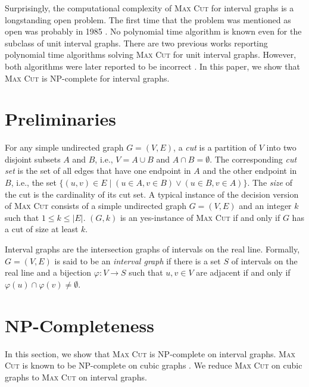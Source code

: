 \documentclass[11pt]{article}
\begin{document}
Surprisingly, the computational complexity of \textsc{Max Cut} for interval graphs is a longstanding open problem. The first time that the problem was mentioned as open was probably in 1985 \cite{JOHNSON1985434}. No polynomial time algorithm is known even for the subclass of unit interval graphs. There are two previous works \cite{bodlaender1999simple, boyaci2017polynomial} reporting polynomial time algorithms solving \textsc{Max Cut} for unit interval graphs. However, both algorithms were later reported to be incorrect \cite{bodlaender2004simple, kratochvil2020u}. In this paper, we show that \textsc{Max Cut} is NP-complete for interval graphs. 


\section{Preliminaries}

For any simple undirected graph $G = (V, E)$, a \emph{cut} is a partition of $V$ into two disjoint subsets $A$ and $B$, i.e., $V = A \cup B$ and $A \cap B = \emptyset$. The corresponding \emph{cut set} is the set of all edges that have one endpoint in $A$ and the other endpoint in $B$, i.e., the set $\{(u,v) \in E \mid (u \in A, v \in B) \vee (u \in B, v \in A) \}$. The \emph{size} of the cut is the cardinality of its cut set. A typical instance of the decision version of \textsc{Max Cut} consists of a simple undirected graph $G = (V, E)$ and an integer $k$ such that $1 \leq k \leq |E|$. $(G, k)$ is an yes-instance of \textsc{Max Cut} if and only if $G$ has a cut of size at least $k$. 

Interval graphs are the intersection graphs of intervals on the real line. Formally, $G = (V, E)$ is said to be an \emph{interval graph} if there is a set $S$ of intervals on the real line and a bijection $\varphi : V \longrightarrow S$ such that $u, v \in V$ are adjacent if and only if $\varphi(u) \cap \varphi(v) \neq \emptyset$.



\section{NP-Completeness} 
In this section, we show that \textsc{Max Cut} is NP-complete on interval graphs. \textsc{Max Cut} is known to be NP-complete on cubic graphs \cite{berman1999some}. We reduce \textsc{Max Cut} on cubic graphs to \textsc{Max Cut} on interval graphs.
\end{document}
